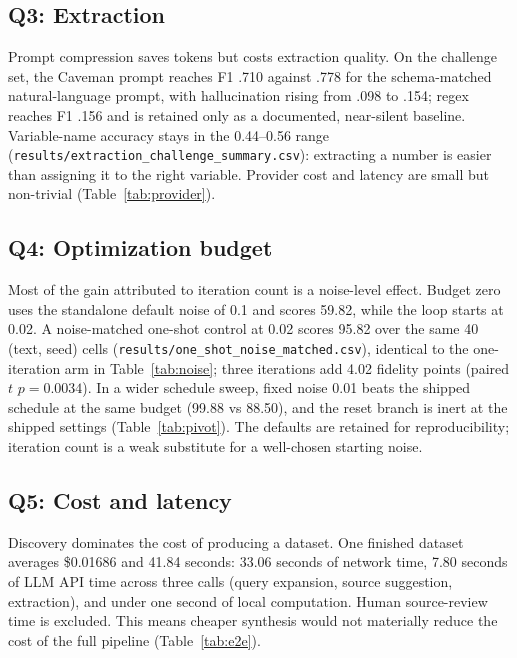 \documentclass[letterpaper]{article}
\begin{document}
\subsection{Q3: Extraction}
\label{sec:q3}

Prompt compression saves tokens but costs extraction quality. On the challenge set, the Caveman
prompt reaches F1 .710 against .778 for the schema-matched natural-language prompt, with
hallucination rising from .098 to .154; regex reaches F1 .156 and is retained only as a documented,
near-silent baseline. Variable-name accuracy stays in the 0.44--0.56 range
(\texttt{results/extraction\_challenge\_summary.csv}): extracting a number is easier than
assigning it to the right variable. Provider cost and latency are small but non-trivial
(Table~\ref{tab:provider}).

\subsection{Q4: Optimization budget}
\label{sec:q4}

Most of the gain attributed to iteration count is a noise-level effect. Budget zero uses the
standalone default noise of 0.1 and scores 59.82, while the loop starts at 0.02. A noise-matched
one-shot control at 0.02 scores 95.82 over the same 40 (text, seed) cells
(\texttt{results/one\_shot\_noise\_matched.csv}), identical to the one-iteration arm in
Table~\ref{tab:noise}; three iterations add 4.02 fidelity points (paired $t$ $p=0.0034$). In a
wider schedule sweep, fixed noise 0.01 beats the shipped schedule at the same budget (99.88 vs
88.50), and the reset branch is inert at the shipped settings (Table~\ref{tab:pivot}). The
defaults are retained for reproducibility; iteration count is a weak substitute for a well-chosen
starting noise.

\subsection{Q5: Cost and latency}
\label{sec:q5}

Discovery dominates the cost of producing a dataset. One finished dataset averages \$0.01686 and
41.84 seconds: 33.06 seconds of network time, 7.80 seconds of LLM API time across three calls
(query expansion, source suggestion, extraction), and under one second of local computation. Human
source-review time is excluded. This means cheaper synthesis would not materially reduce the cost
of the full pipeline (Table~\ref{tab:e2e}).
\end{document}
